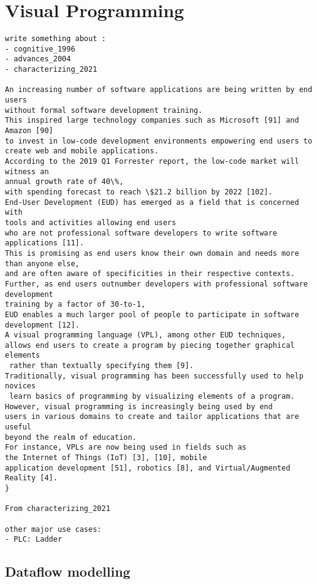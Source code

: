 \section{Visual Programming}
\begin{lstlisting} 
write something about : 
- cognitive_1996 
- advances_2004
- characterizing_2021

An increasing number of software applications are being written by end users 
without formal software development training. 
This inspired large technology companies such as Microsoft [91] and Amazon [90] 
to invest in low-code development environments empowering end users to 
create web and mobile applications. 
According to the 2019 Q1 Forrester report, the low-code market will witness an 
annual growth rate of 40\%, 
with spending forecast to reach \$21.2 billion by 2022 [102]. 
End-User Development (EUD) has emerged as a field that is concerned with 
tools and activities allowing end users 
who are not professional software developers to write software applications [11]. 
This is promising as end users know their own domain and needs more than anyone else, 
and are often aware of specificities in their respective contexts. 
Further, as end users outnumber developers with professional software development 
training by a factor of 30-to-1, 
EUD enables a much larger pool of people to participate in software development [12]. 
A visual programming language (VPL), among other EUD techniques, 
allows end users to create a program by piecing together graphical elements
 rather than textually specifying them [9]. 
Traditionally, visual programming has been successfully used to help novices
 learn basics of programming by visualizing elements of a program. 
However, visual programming is increasingly being used by end 
users in various domains to create and tailor applications that are useful 
beyond the realm of education. 
For instance, VPLs are now being used in fields such as 
the Internet of Things (IoT) [3], [10], mobile 
application development [51], robotics [8], and Virtual/Augmented Reality [4].
}

From characterizing_2021

other major use cases: 
- PLC: Ladder

\end{lstlisting}

\subsection{Dataflow modelling}

